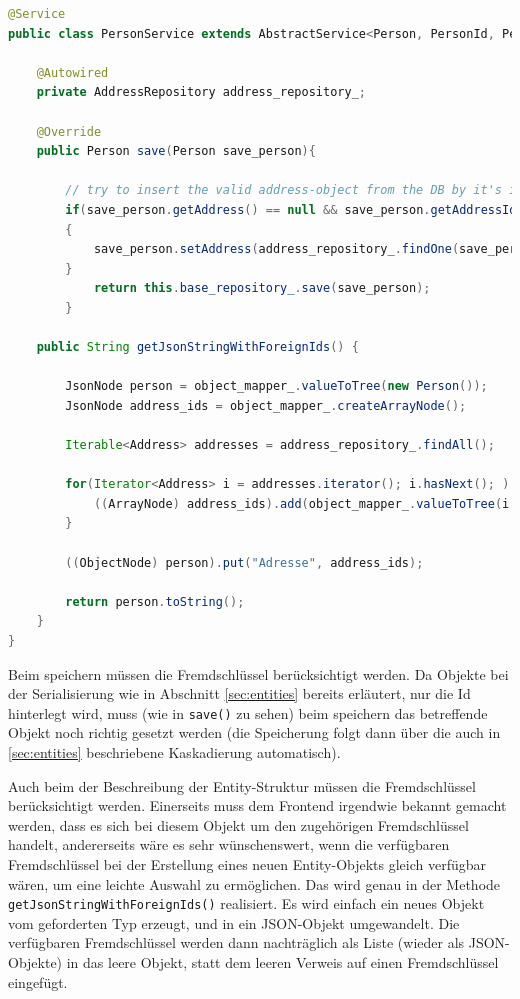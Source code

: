 \scriptsize
\begin{lstlisting}[caption=PersonService.java, label=cs:PersonService, language=Java]
@Service
public class PersonService extends AbstractService<Person, PersonId, PersonRepository>{

	@Autowired
	private AddressRepository address_repository_;
	
	@Override
	public Person save(Person save_person){
	
		// try to insert the valid address-object from the DB by it's id (from JSON)
		if(save_person.getAddress() == null && save_person.getAddressId() != null)
		{
			save_person.setAddress(address_repository_.findOne(save_person.getAddressId()));
		}
			return this.base_repository_.save(save_person);
		}
	
	public String getJsonStringWithForeignIds() {
	
		JsonNode person = object_mapper_.valueToTree(new Person());
		JsonNode address_ids = object_mapper_.createArrayNode();
		
		Iterable<Address> addresses = address_repository_.findAll();
		
		for(Iterator<Address> i = addresses.iterator(); i.hasNext(); ) {
			((ArrayNode) address_ids).add(object_mapper_.valueToTree(i.next().getId()));
		}
		
		((ObjectNode) person).put("Adresse", address_ids);
		
		return person.toString();
	}
}
\end{lstlisting}
\normalsize

Beim speichern müssen die Fremdschlüssel berücksichtigt werden. Da Objekte bei der Serialisierung wie in Abschnitt \ref{sec:entities} bereits erläutert, nur die Id hinterlegt wird, muss (wie in \verb|save()| zu sehen) beim speichern das betreffende Objekt noch richtig gesetzt werden (die Speicherung folgt dann über die auch in \ref{sec:entities} beschriebene Kaskadierung automatisch).

Auch beim der Beschreibung der Entity-Struktur müssen die Fremdschlüssel berücksichtigt werden. Einerseits muss dem Frontend irgendwie bekannt gemacht werden, dass es sich bei diesem Objekt um den zugehörigen Fremdschlüssel handelt, andererseits wäre es sehr wünschenswert, wenn die verfügbaren Fremdschlüssel bei der Erstellung eines neuen Entity-Objekts gleich verfügbar wären, um eine leichte Auswahl zu ermöglichen. Das wird genau in der Methode  \verb|getJsonStringWithForeignIds()| realisiert. Es wird einfach ein neues Objekt vom geforderten Typ erzeugt, und in ein JSON-Objekt umgewandelt. Die verfügbaren Fremdschlüssel werden dann nachträglich als Liste (wieder als JSON-Objekte) in das leere Objekt, statt dem leeren Verweis auf einen Fremdschlüssel eingefügt. 
